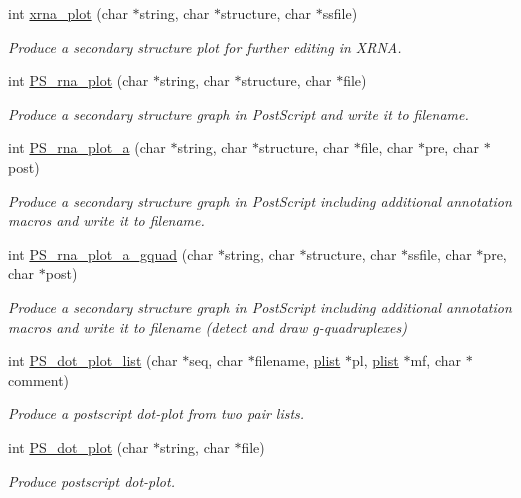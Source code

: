 \begin{DoxyCompactItemize}
int \hyperlink{group__plotting__utils_ga2f6d5953e6a323df898896b8d6614483}{xrna\+\_\+plot} (char $\ast$string, char $\ast$structure, char $\ast$ssfile)
\begin{DoxyCompactList}\small\item\em Produce a secondary structure plot for further editing in X\+R\+NA. \end{DoxyCompactList}\item 
int \hyperlink{group__plotting__utils_ga0873c7cc4cd7a11c9a2cea19dde7e9c9}{P\+S\+\_\+rna\+\_\+plot} (char $\ast$string, char $\ast$structure, char $\ast$file)
\begin{DoxyCompactList}\small\item\em Produce a secondary structure graph in Post\+Script and write it to \textquotesingle{}filename\textquotesingle{}. \end{DoxyCompactList}\item 
int \hyperlink{group__plotting__utils_ga47856b2504b566588785597b6ebb8271}{P\+S\+\_\+rna\+\_\+plot\+\_\+a} (char $\ast$string, char $\ast$structure, char $\ast$file, char $\ast$pre, char $\ast$post)
\begin{DoxyCompactList}\small\item\em Produce a secondary structure graph in Post\+Script including additional annotation macros and write it to \textquotesingle{}filename\textquotesingle{}. \end{DoxyCompactList}\item 
int \hyperlink{group__plotting__utils_ga32fa0f97625119e9d24dd2e7153abc4f}{P\+S\+\_\+rna\+\_\+plot\+\_\+a\+\_\+gquad} (char $\ast$string, char $\ast$structure, char $\ast$ssfile, char $\ast$pre, char $\ast$post)
\begin{DoxyCompactList}\small\item\em Produce a secondary structure graph in Post\+Script including additional annotation macros and write it to \textquotesingle{}filename\textquotesingle{} (detect and draw g-\/quadruplexes) \end{DoxyCompactList}\end{DoxyCompactItemize}
\begin{DoxyCompactItemize}
\item 
int \hyperlink{group__plotting__utils_ga00ea223b5cf02eb2faae5ff29f0d5e12}{P\+S\+\_\+dot\+\_\+plot\+\_\+list} (char $\ast$seq, char $\ast$filename, \hyperlink{group__data__structures_gab1d8894b43aa84cbc50b862a73785fbc}{plist} $\ast$pl, \hyperlink{group__data__structures_gab1d8894b43aa84cbc50b862a73785fbc}{plist} $\ast$mf, char $\ast$comment)
\begin{DoxyCompactList}\small\item\em Produce a postscript dot-\/plot from two pair lists. \end{DoxyCompactList}\item 
int \hyperlink{group__plotting__utils_ga689a97a7e3b8a2df14728b8204d9d57b}{P\+S\+\_\+dot\+\_\+plot} (char $\ast$string, char $\ast$file)
\begin{DoxyCompactList}\small\item\em Produce postscript dot-\/plot. \end{DoxyCompactList}\end{DoxyCompactItemize}


